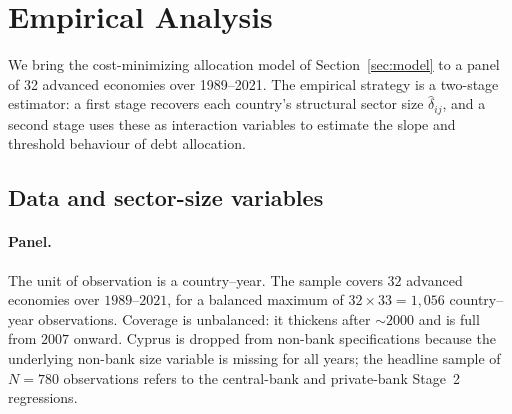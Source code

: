 \documentclass[\latexroot/\projectname]{subfiles}
\begin{document}
\section{Empirical Analysis}
\whenintegrated{\label{sec:empirical}}

We bring the cost-minimizing allocation model of Section~\ref{sec:model}
to a panel of 32 advanced economies over 1989--2021. The empirical
strategy is a two-stage estimator: a first stage recovers each
country's structural sector size $\hat\delta_{ij}$, and a second stage
uses these as interaction variables to estimate the slope and
threshold behaviour of debt allocation.

\subsection{Data and sector-size variables}
\label{sec:data}

\paragraph{Panel.}
The unit of observation is a country--year. The sample covers $32$
advanced economies over $1989$--$2021$, for a balanced maximum of
$32\times 33 = 1{,}056$ country--year observations. Coverage is
unbalanced: it thickens after $\sim\!2000$ and is full from $2007$
onward. Cyprus is dropped from non-bank specifications because the
underlying non-bank size variable is missing for all years; the
headline sample of $N=780$ observations refers to the central-bank and
private-bank Stage~2 regressions.
\end{document}
